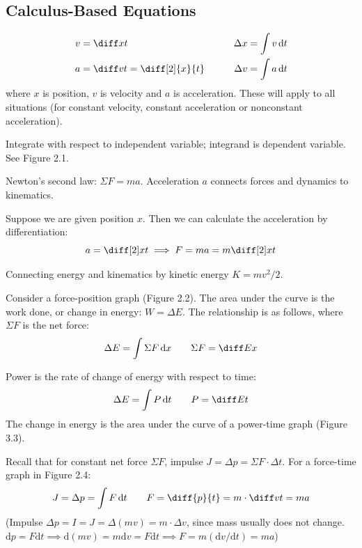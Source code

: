 \documentclass{article}
\newcommand{\theorem}[2]{\begin{tcolorbox}[title={#1},colback=blue!5!white,colframe=blue!75!black,parbox=false] #2 \end{tcolorbox}}
\begin{document}
\subsection{Calculus-Based Equations}

\theorem{Kinematics}{
	\begin{alignat*}{2}
		v&=\diff xt &\qquad \Delta x=\int v\,\mathrm{d}t \\
		a&=\diff vt=\diff[2]{x}{t} &\qquad \Delta v=\int a\,\mathrm{d}t
	\end{alignat*}
	where $x$ is position, $v$ is velocity and $a$ is acceleration. These will apply to all situations (for constant velocity, constant acceleration or nonconstant acceleration).
}

Integrate with respect to independent variable; integrand is dependent variable. See Figure 2.1.

\theorem{Connecting dynamics/forces and kinematics}{
Newton's second law: $\Sigma F=ma$. Acceleration $a$ connects forces and dynamics to kinematics.

Suppose we are given position $x$. Then we can calculate the acceleration by differentiation:
\begin{equation*}
	a=\diff[2]xt
	\implies F=ma=m\diff[2]xt
\end{equation*}
}

Connecting energy and kinematics by kinetic energy $K=mv^2/2$.

\theorem{Work and force-position graphs}{
	Consider a force-position graph (Figure 2.2). The area under the curve is the work done, or change in energy: $W=\Delta E$. The relationship is as follows, where $\Sigma F$ is the net force:
	\begin{equation*}
	    \Delta E=\int\Sigma  F\,\mathrm{d}x
		\qquad \Sigma F=\diff Ex
	\end{equation*}
}

\theorem{Power and time}{
	Power is the rate of change of energy with respect to time:
	\begin{equation*}
		\Delta E=\int P\,\mathrm{d}t \qquad P=\diff Et
	\end{equation*}
	The change in energy is the area under the curve of a power-time graph (Figure 3.3).
}

\theorem{Force and time}{
	Recall that for constant net force $\Sigma F$, impulse $J=\Delta p=\Sigma F\cdot \Delta t$. For a force-time graph in Figure 2.4:
	\begin{equation*}
	    J=\Delta p=\int F\,\mathrm{d}t
		\qquad 
		F=\diff{p}{t}=m\cdot \diff vt=ma
	\end{equation*}
	(Impulse $\Delta p=I=J=\Delta(mv)=m \cdot \Delta v$, since mass usually does not change. $\mathrm{d}p=F\mathrm{d} t \implies \mathrm{d}(mv)=m\mathrm{d} v=F\mathrm{d} t\implies F=m(\mathrm{d}v/\mathrm{d}t)=ma$)
}
\end{document}
